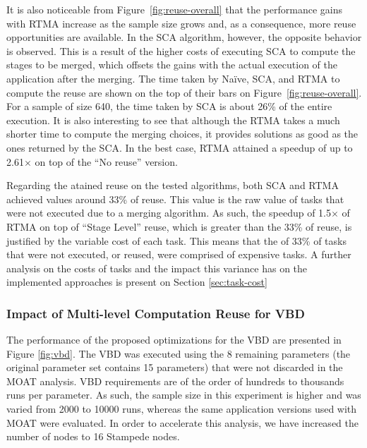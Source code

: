 It is also noticeable from Figure~\ref{fig:reuse-overall} that the performance gains with RTMA increase as the sample size grows and, as a consequence, more reuse opportunities are available. In the SCA algorithm, however, the opposite behavior is observed. This is a result of the higher costs of executing SCA to compute the stages to be merged, which offsets the gains with the actual execution of the application after the merging. The time taken by Na\"ive, SCA, and RTMA to compute the reuse are shown on the top of their bars on Figure~\ref{fig:reuse-overall}. For a sample of size 640, the time taken by SCA is about 26\% of the entire execution. It is also interesting to see that although the RTMA takes a much shorter time to compute the merging choices, it provides solutions as good as the ones returned by the SCA. In the best case, RTMA attained a speedup of up to 2.61$\times$ on top of the ``No reuse'' version. 

Regarding the atained reuse on the tested algorithms, both SCA and RTMA achieved values around 33\% of reuse. This value is the raw value of tasks that were not executed due to a merging algorithm. As such, the speedup of 1.5$\times$ of RTMA on top of ``Stage Level'' reuse, which is greater than the 33\% of reuse, is justified by the variable cost of each task. This means that the of 33\% of tasks that were not executed, or reused, were comprised of expensive tasks. A further analysis on the costs of tasks and the impact this variance has on the implemented approaches is present on Section \ref{sec:task-cost}

\subsubsection{Impact of Multi-level Computation Reuse for VBD}

The performance of the proposed optimizations for the VBD are presented in
Figure \ref{fig:vbd}. The VBD was executed using the 8 remaining parameters
(the original parameter set contains 15 parameters) that were not discarded in
the MOAT analysis. VBD requirements are of the order of hundreds to thousands runs per
parameter. As such, the sample size in this experiment is higher and was varied
from 2000 to 10000 runs, whereas the same application versions used with MOAT
were evaluated. In order to accelerate this analysis, we have increased the
number of nodes to 16 Stampede nodes.

